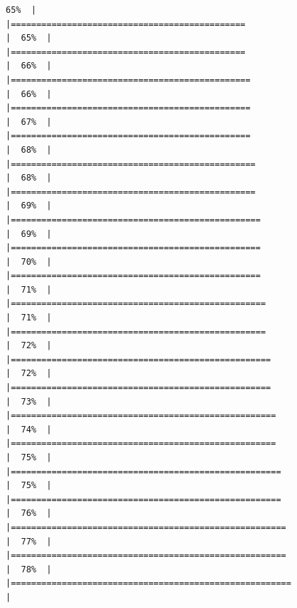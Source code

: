 \documentclass[
  english,
  man,a4paper,mask,floatsintext]{apa6}
\begin{document}
\begin{verbatim}
65%  |                                                                              |==============================================                        |  65%  |                                                                              |==============================================                        |  66%  |                                                                              |===============================================                       |  66%  |                                                                              |===============================================                       |  67%  |                                                                              |===============================================                       |  68%  |                                                                              |================================================                      |  68%  |                                                                              |================================================                      |  69%  |                                                                              |=================================================                     |  69%  |                                                                              |=================================================                     |  70%  |                                                                              |=================================================                     |  71%  |                                                                              |==================================================                    |  71%  |                                                                              |==================================================                    |  72%  |                                                                              |===================================================                   |  72%  |                                                                              |===================================================                   |  73%  |                                                                              |====================================================                  |  74%  |                                                                              |====================================================                  |  75%  |                                                                              |=====================================================                 |  75%  |                                                                              |=====================================================                 |  76%  |                                                                              |======================================================                |  77%  |                                                                              |======================================================                |  78%  |                                                                              |=======================================================               |  
\end{verbatim}
\end{document}
